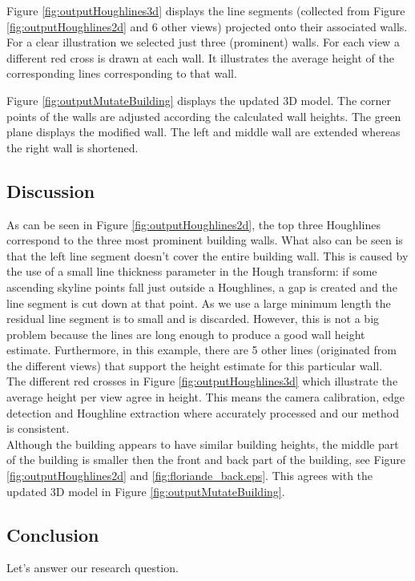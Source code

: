 Figure \ref{fig:outputHoughlines3d} displays the line segments (collected from
Figure \ref{fig:outputHoughlines2d} and 6 other views) projected onto their associated walls.
For a clear illustration we selected just three (prominent) walls.
For each view a different red cross is drawn at each wall. It illustrates the
average height of the corresponding lines corresponding to that wall.
 
Figure \ref{fig:outputMutateBuilding} displays the updated 3D model. The corner
points of the walls are adjusted according the calculated wall heights.  The
green plane displays the modified wall. The left and middle wall are extended
whereas the right wall is shortened.\\


\subsection{Discussion}
As can be seen in Figure \ref{fig:outputHoughlines2d}, 
the top three Houghlines correspond to the three most prominent building walls.
What also can be seen is that the left line segment doesn't cover the entire
building wall. This is caused by the use of
a small line thickness parameter
in the Hough transform: if some ascending skyline points fall just outside
a Houghlines, a gap is created and the line segment is cut down at that point.
As we use a large minimum length the residual line segment is to small and is
discarded.  However, this is not a big problem because the lines are long enough to produce a
good wall height estimate. Furthermore, in this example, there are 5 other lines
(originated from the different views) that support the height estimate for this
particular wall.\\

The different red crosses in Figure \ref{fig:outputHoughlines3d} which illustrate the average height per view 
agree in height. This means the camera calibration, edge detection and Houghline
extraction where accurately processed and our method is consistent. \\

Although the building appears to have similar building heights, the middle part
of the building is smaller then the front and back part of the building, see
Figure \ref{fig:outputHoughlines2d} and \ref{fig:floriande_back.eps}.
This agrees with the updated 3D model in Figure \ref{fig:outputMutateBuilding}.

\subsection{Conclusion}
Let's answer our research question.
